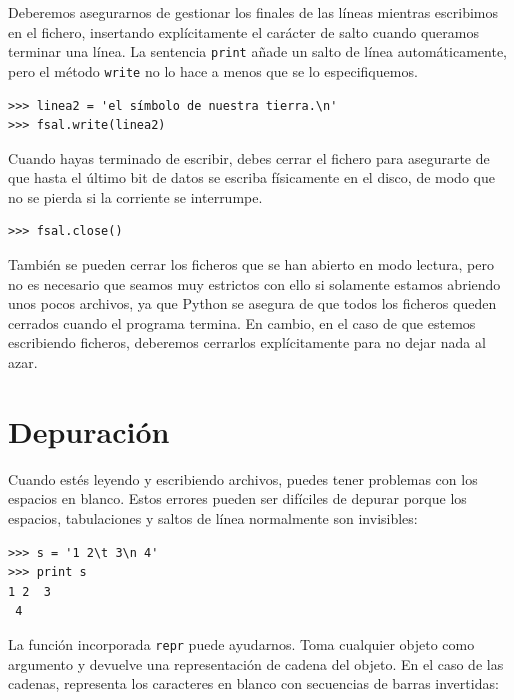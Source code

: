 Deberemos asegurarnos de gestionar los finales de las líneas mientras
escribimos en el fichero, insertando explícitamente el carácter de salto
cuando queramos terminar una línea. La sentencia {\tt print}
añade un salto de línea automáticamente, pero el método
{\tt write} no lo hace a menos que se lo especifiquemos.

\beforeverb
\begin{verbatim}
>>> linea2 = 'el símbolo de nuestra tierra.\n'
>>> fsal.write(linea2)
\end{verbatim}
\afterverb
%
Cuando hayas terminado de escribir, debes cerrar el fichero
para asegurarte de que hasta el último bit de datos se escriba
físicamente en el disco, de modo que no se pierda si la corriente se interrumpe.

\beforeverb
\begin{verbatim}
>>> fsal.close()
\end{verbatim}
\afterverb
%
También se pueden cerrar los ficheros que se han abierto en modo lectura,
pero no es necesario que seamos muy estrictos con ello si solamente
estamos abriendo unos pocos archivos, ya que Python se asegura de que
todos los ficheros queden cerrados cuando el programa termina. En cambio, en el caso
de que estemos escribiendo ficheros, deberemos cerrarlos explícitamente
para no dejar nada al azar.



\section{Depuración}


Cuando estés leyendo y escribiendo archivos, puedes tener problemas
con los espacios en blanco. Estos errores pueden ser difíciles de depurar porque los espacios,
tabulaciones y saltos de línea normalmente son invisibles:

\beforeverb
\begin{verbatim}
>>> s = '1 2\t 3\n 4'
>>> print s
1 2	 3
 4
\end{verbatim}
\afterverb


La función incorporada {\tt repr} puede ayudarnos. Toma cualquier objeto como
argumento y devuelve una representación de cadena del objeto. En el caso
de las cadenas, representa los caracteres en blanco
con secuencias de barras invertidas:

